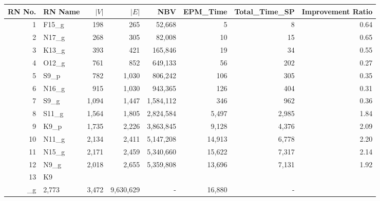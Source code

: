 \begin{tabular}{rlrrrrrr}
\toprule
RN No. & RN Name & $|V|$ & $|E|$ & NBV & EPM_Time & Total_Time_SP & Improvement Ratio \\
\midrule
1 & F15\_g & 198 & 265 & 52,668 & 5 & 8 & 0.64 \\
2 & N17\_g & 268 & 305 & 82,008 & 10 & 15 & 0.65 \\
3 & K13\_g & 393 & 421 & 165,846 & 19 & 34 & 0.55 \\
4 & O12\_g & 761 & 852 & 649,133 & 56 & 202 & 0.27 \\
5 & S9\_p & 782 & 1,030 & 806,242 & 106 & 305 & 0.35 \\
6 & N16\_g & 915 & 1,030 & 943,365 & 126 & 404 & 0.31 \\
7 & S9\_g & 1,094 & 1,447 & 1,584,112 & 346 & 962 & 0.36 \\
8 & S11\_g & 1,564 & 1,805 & 2,824,584 & 5,497 & 2,985 & 1.84 \\
9 & K9\_p & 1,735 & 2,226 & 3,863,845 & 9,128 & 4,376 & 2.09 \\
10 & N11\_g & 2,134 & 2,411 & 5,147,208 & 14,913 & 6,778 & 2.20 \\
11 & N15\_g & 2,171 & 2,459 & 5,340,660 & 15,622 & 7,317 & 2.14 \\
12 & N9\_g & 2,018 & 2,655 & 5,359,808 & 13,696 & 7,131 & 1.92 \\
13 & K9\\_g & 2,773 & 3,472 & 9,630,629 & - & 16,880 & - \\
\bottomrule
\end{tabular}
